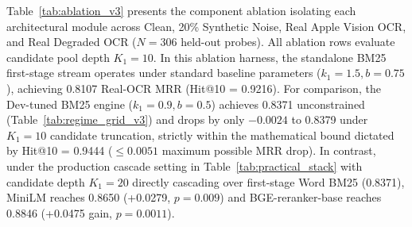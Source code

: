 Table~\ref{tab:ablation_v3} presents the component ablation isolating each architectural module across Clean, 20\% Synthetic Noise, Real Apple Vision OCR, and Real Degraded OCR ($N=306$ held-out probes). All ablation rows evaluate candidate pool depth $K_1=10$. In this ablation harness, the standalone BM25 first-stage stream operates under standard baseline parameters ($k_1=1.5, b=0.75$), achieving 0.8107 Real-OCR MRR (Hit@10 = 0.9216). For comparison, the Dev-tuned BM25 engine ($k_1=0.9, b=0.5$) achieves 0.8371 unconstrained (Table~\ref{tab:regime_grid_v3}) and drops by only $-0.0024$ to 0.8379 under $K_1=10$ candidate truncation, strictly within the mathematical bound dictated by Hit@10 = 0.9444 ($\le 0.0051$ maximum possible MRR drop). In contrast, under the production cascade setting in Table~\ref{tab:practical_stack} with candidate depth $K_1=20$ directly cascading over first-stage Word BM25 (0.8371), MiniLM reaches 0.8650 (+0.0279, $p=0.009$) and BGE-reranker-base reaches 0.8846 (+0.0475 gain, $p=0.0011$).

